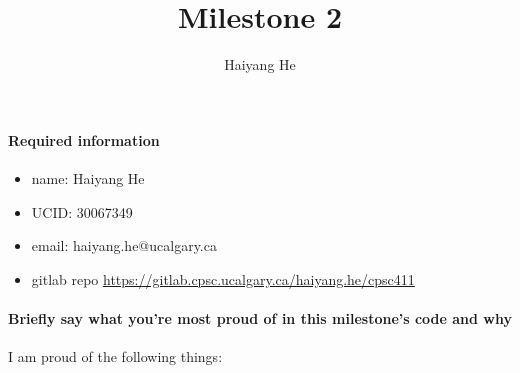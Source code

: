 \documentclass{article}
\author{Haiyang He}
\title{Milestone 2}
\begin{document}
\maketitle
\paragraph{Required information}
    \begin{itemize}
        \item name: Haiyang He
        \item UCID: 30067349
        \item email: haiyang.he@ucalgary.ca
        \item gitlab repo \url{https://gitlab.cpsc.ucalgary.ca/haiyang.he/cpsc411}
    \end{itemize}
\paragraph{Briefly say what you're most proud of in this milestone's code and why}
I am proud of the following things:
\end{document}
